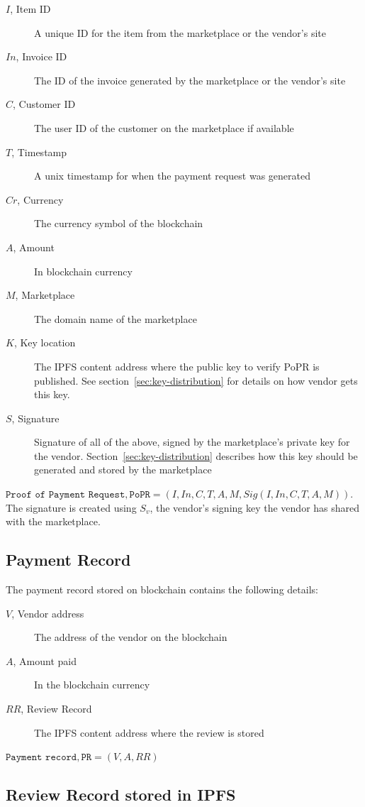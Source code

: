\documentclass[a4paper]{article}
\begin{document}
\begin{description}
\item[$I$, Item ID] A unique ID for the item from the marketplace or the vendor's site
\item[$In$, Invoice ID] The ID of the invoice generated by the marketplace or the vendor's site
\item[$C$, Customer ID] The user ID of the customer on the marketplace if available
\item[$T$, Timestamp] A unix timestamp for when the payment request was generated
\item[$Cr$, Currency] The currency symbol of the blockchain
\item[$A$, Amount] In blockchain currency 
\item[$M$, Marketplace] The domain name of the marketplace
\item[$K$, Key location] The IPFS content address where the public key
  to verify PoPR is published. See section~\ref{sec:key-distribution}
  for details on how vendor gets this key.
\item[$S$, Signature] Signature of all of the above, signed by the
  marketplace's private key for the
  vendor. Section~\ref{sec:key-distribution} describes how this key
  should be generated and stored by the marketplace
\end{description}

$\texttt{Proof of Payment Request}, \texttt{PoPR} = (I, In, C, T, A,
M, Sig(I,In,C, T, A, M))$. The signature is created using $S_v$, the
vendor's signing key the vendor has shared with the marketplace.

\subsection{Payment Record}

The payment record stored on blockchain contains the following
details:

\begin{description}
\item[$V$, Vendor address] The address of the vendor on the blockchain
\item[$A$, Amount paid] In the blockchain currency
\item[$RR$, Review Record] The IPFS content address where the review
  is stored
\end{description}

$\texttt{Payment record}, \texttt{PR} = (V, A, RR)$


\subsection{Review Record stored in IPFS}
  
\end{document}
